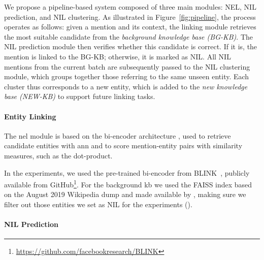 We propose a pipeline-based system composed of three main modules: NEL, NIL prediction, and NIL clustering. As illustrated in Figure~\ref{fig:pipeline}, the process operates as follows: given a mention and its context, the linking module retrieves the most suitable candidate from the \emph{background knowledge base (BG-KB)}. The NIL prediction module then verifies whether this candidate is correct. If it is, the mention is linked to the BG-KB; otherwise, it is marked as NIL. All NIL mentions from the current batch are subsequently passed to the NIL clustering module, which groups together those referring to the same unseen entity. Each cluster thus corresponds to a new entity, which is added to the \emph{new knowledge base (NEW-KB)} to support future linking tasks. 



\paragraph{Entity Linking}
The \ac{nel} module is based on the bi-encoder architecture \cite{Humeau2020Poly-encoders,blink,gillick-etal-2019-learning}, used to retrieve candidate entities with \ac{ann} and to score mention-entity pairs with similarity measures, such as the dot-product. 



In the experiments, we used the pre-trained bi-encoder from BLINK~\cite{blink}, publicly available from GitHub\footnote{\url{https://github.com/facebookresearch/BLINK}}.
For the background \ac{kb} we used the FAISS \cite{faiss} index based on the August 2019 Wikipedia dump and made available by \textcite{blink}, making sure we filter out those entities we set as NIL for the experiments ().



\paragraph{NIL Prediction}

